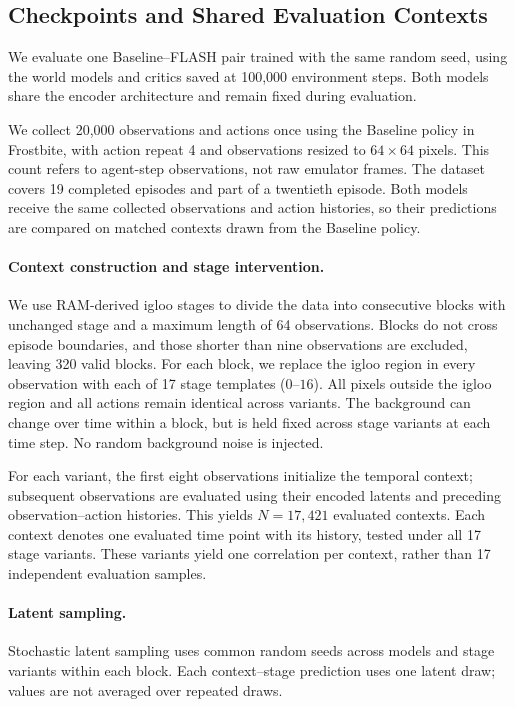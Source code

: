 \documentclass{article} %
\begin{document}
\subsection{Checkpoints and Shared Evaluation Contexts}
We evaluate one Baseline--FLASH pair trained with the same random seed, using the world models and critics saved at 100,000 environment steps. Both models share the encoder architecture and remain fixed during evaluation.

We collect 20,000 observations and actions once using the Baseline policy in Frostbite, with action repeat 4 and observations resized to $64\times64$ pixels. This count refers to agent-step observations, not raw emulator frames. The dataset covers 19 completed episodes and part of a twentieth episode. Both models receive the same collected observations and action histories, so their predictions are compared on matched contexts drawn from the Baseline policy.

\paragraph{Context construction and stage intervention.}
We use RAM-derived igloo stages to divide the data into consecutive blocks with unchanged stage and a maximum length of 64 observations. Blocks do not cross episode boundaries, and those shorter than nine observations are excluded, leaving 320 valid blocks. For each block, we replace the igloo region in every observation with each of 17 stage templates ($0$--$16$). All pixels outside the igloo region and all actions remain identical across variants. The background can change over time within a block, but is held fixed across stage variants at each time step. No random background noise is injected.

For each variant, the first eight observations initialize the temporal context; subsequent observations are evaluated using their encoded latents and preceding observation--action histories. This yields $N=17{,}421$ evaluated contexts. Each context denotes one evaluated time point with its history, tested under all 17 stage variants. These variants yield one correlation per context, rather than 17 independent evaluation samples.

\paragraph{Latent sampling.}
Stochastic latent sampling uses common random seeds across models and stage variants within each block. Each context--stage prediction uses one latent draw; values are not averaged over repeated draws.
\end{document}
